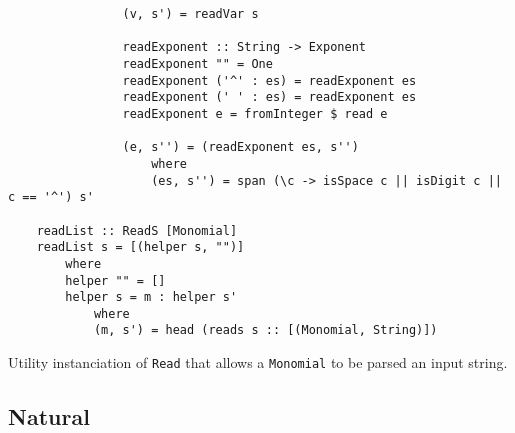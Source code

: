 \documentclass[11pt,a4paper]{article}
\begin{document}
\begin{itemize}
\begin{lstlisting}
                (v, s') = readVar s
    
                readExponent :: String -> Exponent
                readExponent "" = One
                readExponent ('^' : es) = readExponent es
                readExponent (' ' : es) = readExponent es
                readExponent e = fromInteger $ read e
    
                (e, s'') = (readExponent es, s'')
                    where
                    (es, s'') = span (\c -> isSpace c || isDigit c || c == '^') s'
    
    readList :: ReadS [Monomial]
    readList s = [(helper s, "")]
        where
        helper "" = []
        helper s = m : helper s'
            where
            (m, s') = head (reads s :: [(Monomial, String)])
    \end{lstlisting}

    Utility instanciation of \lstinline{Read} that allows a \lstinline{Monomial} to be parsed an input string.

\end{itemize}

\subsection{Natural}
\end{document}
